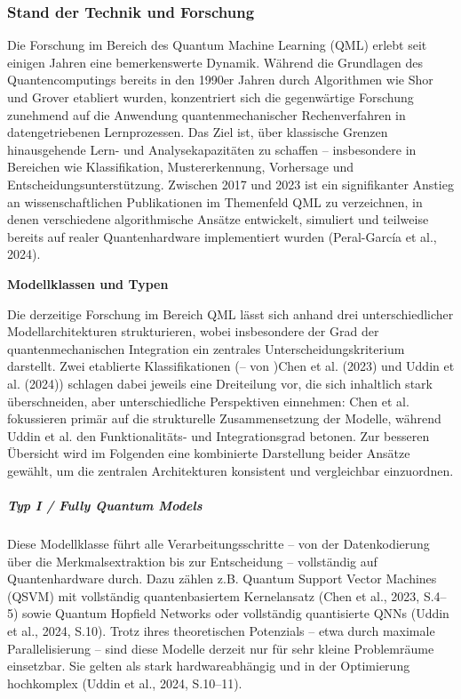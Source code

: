 \vspace{0.5cm}


\subsubsection{Stand der Technik und Forschung}
\noindent
Die Forschung im Bereich des Quantum Machine Learning (QML) erlebt seit einigen Jahren eine bemerkenswerte Dynamik. Während die Grundlagen des Quantencomputings bereits in den 1990er Jahren durch Algorithmen wie Shor und Grover etabliert wurden, konzentriert sich die gegenwärtige Forschung zunehmend auf die Anwendung quantenmechanischer Rechenverfahren in datengetriebenen Lernprozessen. Das Ziel ist, über klassische Grenzen hinausgehende Lern- und Analysekapazitäten zu schaffen – insbesondere in Bereichen wie Klassifikation, Mustererkennung, Vorhersage und Entscheidungsunterstützung. Zwischen 2017 und 2023 ist ein signifikanter Anstieg an wissenschaftlichen Publikationen im Themenfeld QML zu verzeichnen, in denen verschiedene algorithmische Ansätze entwickelt, simuliert und teilweise bereits auf realer Quantenhardware implementiert wurden (Peral-García et al., 2024).

\vspace{1em}
\noindent\textbf{Modellklassen und Typen}

\noindent
Die derzeitige Forschung im Bereich QML lässt sich anhand drei unterschiedlicher Modellarchitekturen strukturieren, wobei insbesondere der Grad der quantenmechanischen Integration ein zentrales Unterscheidungskriterium darstellt. Zwei etablierte Klassifikationen (– von )Chen et al. (2023) und Uddin et al. (2024)) schlagen dabei jeweils eine Dreiteilung vor, die sich inhaltlich stark überschneiden, aber unterschiedliche Perspektiven einnehmen: Chen et al. fokussieren primär auf die strukturelle Zusammensetzung der Modelle, während Uddin et al. den Funktionalitäts- und Integrationsgrad betonen.
Zur besseren Übersicht wird im Folgenden eine kombinierte Darstellung beider Ansätze gewählt, um die zentralen Architekturen konsistent und vergleichbar einzuordnen.

\subparagraph{Typ I / Fully Quantum Models}
Diese Modellklasse führt alle Verarbeitungsschritte – von der Datenkodierung über die Merkmalsextraktion bis zur Entscheidung – vollständig auf Quantenhardware durch. Dazu zählen z.B. Quantum Support Vector Machines (QSVM) mit vollständig quantenbasiertem Kernelansatz (Chen et al., 2023, S.4–5) sowie Quantum Hopfield Networks oder vollständig quantisierte QNNs (Uddin et al., 2024, S.10).
Trotz ihres theoretischen Potenzials – etwa durch maximale Parallelisierung – sind diese Modelle derzeit nur für sehr kleine Problemräume einsetzbar. Sie gelten als stark hardwareabhängig und in der Optimierung hochkomplex (Uddin et al., 2024, S.10–11).

